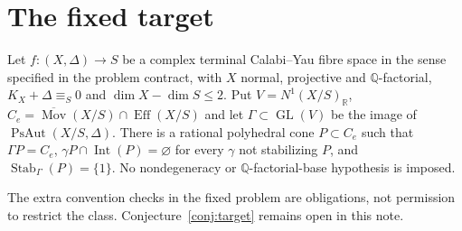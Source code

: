 \section{The fixed target}\label{sec:target}
\begin{conjecture}\label{conj:target}
Let $f:(X,\Delta)\to S$ be a complex terminal Calabi--Yau fibre space in the sense specified in the problem contract, with $X$ normal, projective and $\mathbb Q$-factorial, $K_X+\Delta\equiv_S0$ and $\dim X-\dim S\leq2$.
Put $V=N^1(X/S)_{\mathbb R}$, $C_e=\overline{\operatorname{Mov}}(X/S)\cap\operatorname{Eff}(X/S)$ and let $\Gamma\subset\operatorname{GL}(V)$ be the image of $\operatorname{PsAut}(X/S,\Delta)$.
There is a rational polyhedral cone $P\subset C_e$ such that $\Gamma P=C_e$, $\gamma P\cap\operatorname{Int}(P)=\varnothing$ for every $\gamma$ not stabilizing $P$, and $\operatorname{Stab}_\Gamma(P)=\{1\}$. No nondegeneracy or $\mathbb Q$-factorial-base hypothesis is imposed.
\end{conjecture}
\noindent The extra convention checks in the fixed problem are obligations, not permission to restrict the class. Conjecture~\ref{conj:target} remains open in this note.
